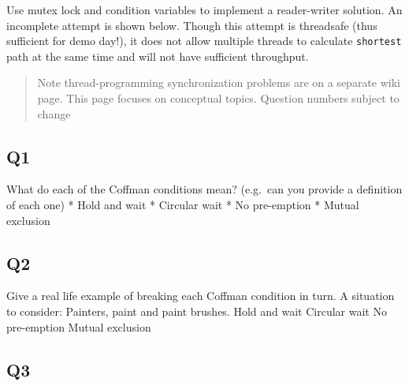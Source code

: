 Use mutex lock and condition variables to implement a reader-writer
solution. An incomplete attempt is shown below. Though this attempt is
threadsafe (thus sufficient for demo day!), it does not allow multiple
threads to calculate \texttt{shortest} path at the same time and will
not have sufficient throughput.

\begin{Shaded}
\begin{Highlighting}[]
  
   
\NormalTok{\}}
    
\NormalTok{\}}
\end{Highlighting}
\end{Shaded}

\begin{quote}
Note thread-programming synchronization problems are on a separate wiki
page. This page focuses on conceptual topics. Question numbers subject
to change
\end{quote}

\subsection{Q1}\label{q1-1}

What do each of the Coffman conditions mean? (e.g.~can you provide a
definition of each one) * Hold and wait * Circular wait * No pre-emption
* Mutual exclusion

\subsection{Q2}\label{q2-1}

Give a real life example of breaking each Coffman condition in turn. A
situation to consider: Painters, paint and paint brushes. Hold and wait
Circular wait No pre-emption Mutual exclusion

\subsection{Q3}\label{q3-1}

